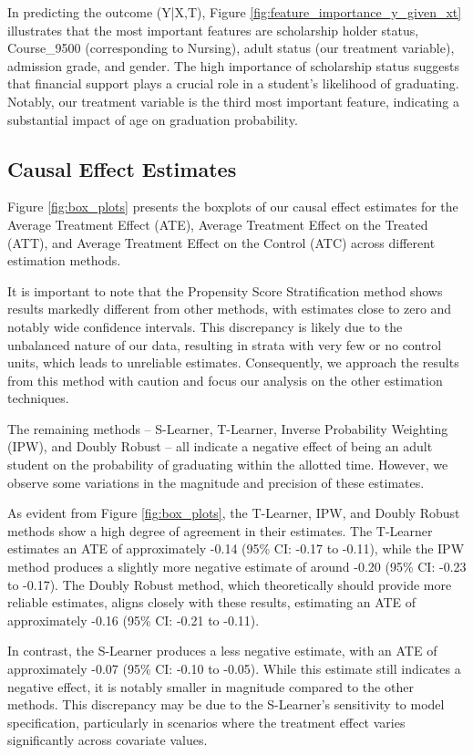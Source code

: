 \documentclass{article}
\begin{document}
In predicting the outcome (Y|X,T), Figure \ref{fig:feature_importance_y_given_xt} illustrates that the most important features are scholarship holder status, Course\_9500 (corresponding to Nursing), adult status (our treatment variable), admission grade, and gender. The high importance of scholarship status suggests that financial support plays a crucial role in a student's likelihood of graduating. Notably, our treatment variable is the third most important feature, indicating a substantial impact of age on graduation probability.

\subsection{Causal Effect Estimates}

Figure \ref{fig:box_plots} presents the boxplots of our causal effect estimates for the Average Treatment Effect (ATE), Average Treatment Effect on the Treated (ATT), and Average Treatment Effect on the Control (ATC) across different estimation methods. 

It is important to note that the Propensity Score Stratification method shows results markedly different from other methods, with estimates close to zero and notably wide confidence intervals. This discrepancy is likely due to the unbalanced nature of our data, resulting in strata with very few or no control units, which leads to unreliable estimates. Consequently, we approach the results from this method with caution and focus our analysis on the other estimation techniques.

The remaining methods -- S-Learner, T-Learner, Inverse Probability Weighting (IPW), and Doubly Robust -- all indicate a negative effect of being an adult student on the probability of graduating within the allotted time. However, we observe some variations in the magnitude and precision of these estimates. 

As evident from Figure \ref{fig:box_plots}, the T-Learner, IPW, and Doubly Robust methods show a high degree of agreement in their estimates. The T-Learner estimates an ATE of approximately -0.14 (95\% CI: -0.17 to -0.11), while the IPW method produces a slightly more negative estimate of around -0.20 (95\% CI: -0.23 to -0.17). The Doubly Robust method, which theoretically should provide more reliable estimates, aligns closely with these results, estimating an ATE of approximately -0.16 (95\% CI: -0.21 to -0.11).

In contrast, the S-Learner produces a less negative estimate, with an ATE of approximately -0.07 (95\% CI: -0.10 to -0.05). While this estimate still indicates a negative effect, it is notably smaller in magnitude compared to the other methods. This discrepancy may be due to the S-Learner's sensitivity to model specification, particularly in scenarios where the treatment effect varies significantly across covariate values.
\end{document}

